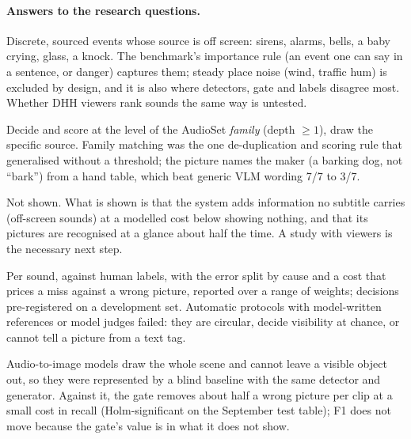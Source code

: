 \paragraph{Answers to the research questions.}
\begin{description}[style=nextline]
  \item[RQ1 -- which audio information matters most?] Discrete, sourced events whose source is off screen: sirens,
        alarms, bells, a baby crying, glass, a knock. The benchmark's importance rule (an event one can say in a
        sentence, or danger) captures them; steady place noise (wind, traffic hum) is excluded by design, and it is
        also where detectors, gate and labels disagree most. Whether DHH viewers rank sounds the same way is untested.
  \item[RQ2 -- what granularity?] Decide and score at the level of the AudioSet \emph{family} (depth $\geq 1$), draw the
        specific source. Family matching was the one de-duplication and scoring rule that generalised without a
        threshold; the picture names the maker (a barking dog, not ``bark'') from a hand table, which beat generic VLM
        wording 7/7 to 3/7.
  \item[RQ3 -- can generated augmentations improve accessibility beyond subtitles?] Not shown. What is shown is that
        the system adds information no subtitle carries (off-screen sounds) at a modelled cost below showing nothing,
        and that its pictures are recognised at a glance about half the time. A study with viewers is the necessary next
        step.
  \item[RQ4 -- how to evaluate?] Per sound, against human labels, with the error split by cause and a cost that prices
        a miss against a wrong picture, reported over a range of weights; decisions pre-registered on a development set.
        Automatic protocols with model-written references or model judges failed: they are circular, decide visibility
        at chance, or cannot tell a picture from a text tag.
  \item[RQ5 -- comparison with audio-to-visual approaches?] Audio-to-image models draw the whole scene and cannot leave
        a visible object out, so they were represented by a blind baseline with the same detector and generator. Against
        it, the gate removes about half a wrong picture per clip at a small cost in recall (Holm-significant on the
        September test table); F1 does not move because the gate's value is in what it does not show.
\end{description}
